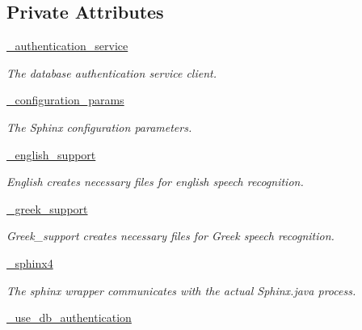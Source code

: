 \subsection*{Private Attributes}
\begin{DoxyCompactItemize}
\item 
\hyperlink{classrapp__speech__detection__sphinx4_1_1speech__recognition__sphinx4_1_1SpeechRecognitionSphinx4_a3bec3325c78ed73478b35a9872589f1a}{\-\_\-authentication\-\_\-service}
\begin{DoxyCompactList}\small\item\em The database authentication service client. \end{DoxyCompactList}\item 
\hyperlink{classrapp__speech__detection__sphinx4_1_1speech__recognition__sphinx4_1_1SpeechRecognitionSphinx4_ab6a1a99c38bcc6938c0f0a39dd355a04}{\-\_\-configuration\-\_\-params}
\begin{DoxyCompactList}\small\item\em The Sphinx configuration parameters. \end{DoxyCompactList}\item 
\hyperlink{classrapp__speech__detection__sphinx4_1_1speech__recognition__sphinx4_1_1SpeechRecognitionSphinx4_ad506f14432d9452c85b900d79e03c589}{\-\_\-english\-\_\-support}
\begin{DoxyCompactList}\small\item\em English creates necessary files for english speech recognition. \end{DoxyCompactList}\item 
\hyperlink{classrapp__speech__detection__sphinx4_1_1speech__recognition__sphinx4_1_1SpeechRecognitionSphinx4_a4647fa82a552fe670b70550c5e66a253}{\-\_\-greek\-\_\-support}
\begin{DoxyCompactList}\small\item\em Greek\-\_\-support creates necessary files for Greek speech recognition. \end{DoxyCompactList}\item 
\hyperlink{classrapp__speech__detection__sphinx4_1_1speech__recognition__sphinx4_1_1SpeechRecognitionSphinx4_a01424766fb7384f6d005f4be78725af4}{\-\_\-sphinx4}
\begin{DoxyCompactList}\small\item\em The sphinx wrapper communicates with the actual Sphinx.\-java process. \end{DoxyCompactList}\item 
\hyperlink{classrapp__speech__detection__sphinx4_1_1speech__recognition__sphinx4_1_1SpeechRecognitionSphinx4_a8f26419fdb196abdf936de3ce2b773cf}{\-\_\-use\-\_\-db\-\_\-authentication}

\end{DoxyCompactItemize}
